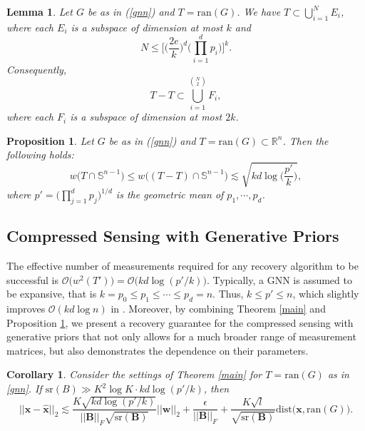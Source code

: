\documentclass{article}
\def \xhat {\mathbf{\hat{x}}}
\newtheorem{corollary}{Corollary}[theorem]
\newtheorem{lemma}[theorem]{Lemma}
\newtheorem{proposition}[theorem]{Proposition}
\begin{document}
\begin{lemma} \label{count}
Let $G$ be as in (\ref{gnn}) and $T = \mathrm{ran}(G)$. We have $T \subset \bigcup_{i=1}^{N} E_i$,
where each $E_i$ is a subspace of dimension at most $k$ and
\begin{equation}
    N \leq \Big[\big(\frac{2e}{k}\big)^{d}\Big(\prod_{i=1}^{d}p_i\Big)\Big]^k.
\end{equation}
Consequently,
\begin{equation*}
    T-T \subset \bigcup_{i=1}^{N \choose 2} F_i,
\end{equation*}
where each $F_i$ is a subspace of dimension at most $2k$.
\end{lemma}


\begin{proposition} \label{width}
Let $G$ be as in (\ref{gnn}) and $T = \mathrm{ran}(G) \subset \mathbb{R}^n$. Then the following holds:
\begin{equation}
    w \big( T \cap \mathbb{S}^{n-1} \big) \leq w \big( (T-T) \cap \mathbb{S}^{n-1} \big) \lesssim \sqrt{kd \log \Big( \frac{p'}{k} \Big)},
\end{equation}
where $p' = \Big( \prod_{j=1}^{d} p_j \Big)^{1/d}$ is the geometric mean of $p_1, \cdots, p_d$.
\end{proposition}
\par


\subsection{Compressed Sensing with Generative Priors} \label{CS-GNN}

The effective number of measurements required for any recovery algorithm to be successful is $\mathcal{O} \big( w^2(T') \big) = \mathcal{O} \big( kd \log (p'/k) \big)$. Typically, a GNN is assumed to be expansive, that is $k = p_0 \leq p_1 \leq \cdots \leq p_d = n$. Thus, $k \leq p' \leq n$, which slightly improves $\mathcal{O}(kd \log n)$ in \cite{bora2017compressed}. Moreover, by combining Theorem \ref{main} and Proposition \ref{width}, we present a recovery guarantee for the compressed sensing with generative priors that not only allows for a much broader range of measurement matrices, but also demonstrates the dependence on their parameters.

\begin{corollary}
Consider the settings of Theorem \ref{main} for $T = \mathrm{ran}(G)$ as in \eqref{gnn}. If $\mathrm{sr}(B) \gg K^2 \log K \cdot kd \log(p'/k)$, then
\begin{equation}
    ||\mathbf{x} - \xhat||_2 \lesssim \frac{K\sqrt{kd \log(p'/k)}}{||\mathbf{B}||_F \sqrt{\mathrm{sr}(\mathbf{B})}} ||\mathbf{w}||_2 + \frac{\epsilon}{||\mathbf{B}||_F} + \frac{K\sqrt{l}}{\sqrt{\mathrm{sr}(\mathbf{B})}} \mathrm{dist}\big(\mathbf{x}, \mathrm{ran}(G)\big).
\end{equation}
\end{corollary}
\end{document}
